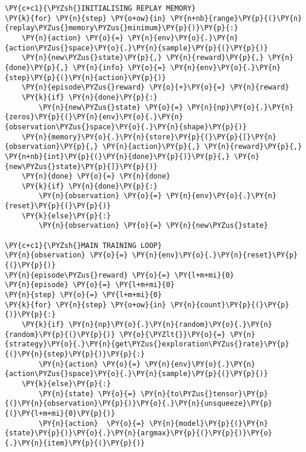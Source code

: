 \begin{tcolorbox}[breakable, size=fbox, boxrule=1pt, pad at break*=1mm,colback=cellbackground, colframe=cellborder]
\begin{Verbatim}[commandchars=\\\{\}]
\PY{c+c1}{\PYZsh{}INITIALISING REPLAY MEMORY}
\PY{k}{for} \PY{n}{step} \PY{o+ow}{in} \PY{n+nb}{range}\PY{p}{(}\PY{n}{replay\PYZus{}memory\PYZus{}minimum}\PY{p}{)}\PY{p}{:}
    \PY{n}{action} \PY{o}{=} \PY{n}{env}\PY{o}{.}\PY{n}{action\PYZus{}space}\PY{o}{.}\PY{n}{sample}\PY{p}{(}\PY{p}{)}
    \PY{n}{new\PYZus{}state}\PY{p}{,} \PY{n}{reward}\PY{p}{,} \PY{n}{done}\PY{p}{,} \PY{n}{info} \PY{o}{=} \PY{n}{env}\PY{o}{.}\PY{n}{step}\PY{p}{(}\PY{n}{action}\PY{p}{)}
    \PY{n}{episode\PYZus{}reward} \PY{o}{+}\PY{o}{=} \PY{n}{reward}
    \PY{k}{if} \PY{n}{done}\PY{p}{:}
        \PY{n}{new\PYZus{}state} \PY{o}{=} \PY{n}{np}\PY{o}{.}\PY{n}{zeros}\PY{p}{(}\PY{n}{env}\PY{o}{.}\PY{n}{observation\PYZus{}space}\PY{o}{.}\PY{n}{shape}\PY{p}{)}
    \PY{n}{memory}\PY{o}{.}\PY{n}{store}\PY{p}{(}\PY{p}{[}\PY{n}{observation}\PY{p}{,} \PY{n}{action}\PY{p}{,} \PY{n}{reward}\PY{p}{,} \PY{n+nb}{int}\PY{p}{(}\PY{n}{done}\PY{p}{)}\PY{p}{,} \PY{n}{new\PYZus{}state}\PY{p}{]}\PY{p}{)}
    \PY{n}{done} \PY{o}{=} \PY{n}{done}
    \PY{k}{if} \PY{n}{done}\PY{p}{:}
        \PY{n}{observation} \PY{o}{=} \PY{n}{env}\PY{o}{.}\PY{n}{reset}\PY{p}{(}\PY{p}{)}
    \PY{k}{else}\PY{p}{:} 
        \PY{n}{observation} \PY{o}{=} \PY{n}{new\PYZus{}state}    

\PY{c+c1}{\PYZsh{}MAIN TRAINING LOOP}
\PY{n}{observation} \PY{o}{=} \PY{n}{env}\PY{o}{.}\PY{n}{reset}\PY{p}{(}\PY{p}{)}
\PY{n}{episode\PYZus{}reward} \PY{o}{=} \PY{l+m+mi}{0}
\PY{n}{episode} \PY{o}{=} \PY{l+m+mi}{0}
\PY{n}{step} \PY{o}{=} \PY{l+m+mi}{0}    
\PY{k}{for} \PY{n}{step} \PY{o+ow}{in} \PY{n}{count}\PY{p}{(}\PY{p}{)}\PY{p}{:}
    \PY{k}{if} \PY{n}{np}\PY{o}{.}\PY{n}{random}\PY{o}{.}\PY{n}{random}\PY{p}{(}\PY{p}{)} \PY{o}{\PYZlt{}}\PY{o}{=} \PY{n}{strategy}\PY{o}{.}\PY{n}{get\PYZus{}exploration\PYZus{}rate}\PY{p}{(}\PY{n}{step}\PY{p}{)}\PY{p}{:}
        \PY{n}{action} \PY{o}{=} \PY{n}{env}\PY{o}{.}\PY{n}{action\PYZus{}space}\PY{o}{.}\PY{n}{sample}\PY{p}{(}\PY{p}{)}
    \PY{k}{else}\PY{p}{:}
        \PY{n}{state} \PY{o}{=} \PY{n}{to\PYZus{}tensor}\PY{p}{(}\PY{n}{observation}\PY{p}{)}\PY{o}{.}\PY{n}{unsqueeze}\PY{p}{(}\PY{l+m+mi}{0}\PY{p}{)}
        \PY{n}{action}  \PY{o}{=} \PY{n}{model}\PY{p}{(}\PY{n}{state}\PY{p}{)}\PY{o}{.}\PY{n}{argmax}\PY{p}{(}\PY{p}{)}\PY{o}{.}\PY{n}{item}\PY{p}{(}\PY{p}{)}


\end{Verbatim}
\end{tcolorbox}
